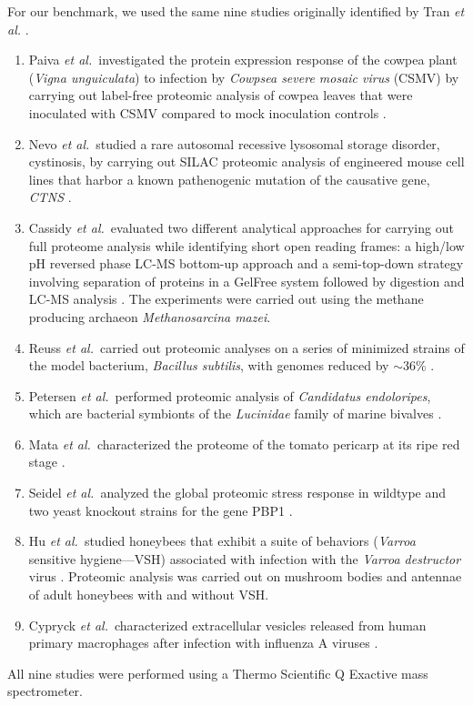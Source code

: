 \documentclass{article}
\begin{document}
For our benchmark, we used the same nine studies originally identified by Tran {\em et al.} \cite{tran2017denovo}.
\begin{enumerate}
\item Paiva \textit{et al.}\ investigated the protein expression response of the cowpea plant (\textit{Vigna unguiculata}) to infection by \textit{Cowpsea severe mosaic virus} (CSMV) by carrying out label-free proteomic analysis of cowpea leaves that were inoculated with CSMV compared to mock inoculation controls \cite{paiva2016label}.
\item Nevo \textit{et al.}\ studied a rare autosomal recessive lysosomal storage disorder, cystinosis, by carrying out SILAC proteomic analysis of engineered mouse cell lines that harbor a known pathenogenic mutation of the causative gene, \textit{CTNS} \cite{nevo2017impact}.
\item Cassidy \textit{et al.}\ evaluated two different analytical approaches for carrying out full proteome analysis while identifying short open reading frames: a high/low pH reversed phase LC-MS bottom-up approach and a semi-top-down strategy involving separation of proteins in a GelFree system followed by digestion and LC-MS analysis \cite{cassidy2016combination}. The experiments were carried out using the methane producing archaeon \textit{Methanosarcina mazei}.
\item Reuss \textit{et al.}\ carried out proteomic analyses on a series of minimized strains of the model bacterium, \textit{Bacillus subtilis}, with genomes reduced by $\sim$36\% \cite{reuss2017large}.
\item Petersen \textit{et al.}\ performed proteomic analysis of \textit{Candidatus endoloripes}, which are bacterial symbionts of the \textit{Lucinidae} family of marine bivalves \cite{petersen2016chemosynthetic}.
\item Mata \textit{et al.}\ characterized the proteome of the tomato pericarp at its ripe red stage \cite{mata2017depth}.
\item Seidel \textit{et al.}\ analyzed the global proteomic stress response in wildtype and two yeast knockout strains for the gene PBP1  \cite{seidel2017quantitative}.
\item Hu \textit{et al.}\ studied honeybees that exhibit a suite of behaviors (\textit{Varroa} sensitive hygiene---VSH) associated with infection with the \textit{Varroa destructor} virus \cite{hu2016proteome}.  Proteomic analysis was carried out on mushroom bodies and antennae of adult honeybees with and without VSH.
\item Cypryck \textit{et al.}\ characterized extracellular vesicles released from human primary macrophages after infection with influenza A viruses \cite{cypryk2017proteomic}.
\end{enumerate}
All nine studies were performed using a Thermo Scientific Q Exactive mass spectrometer.
\end{document}
